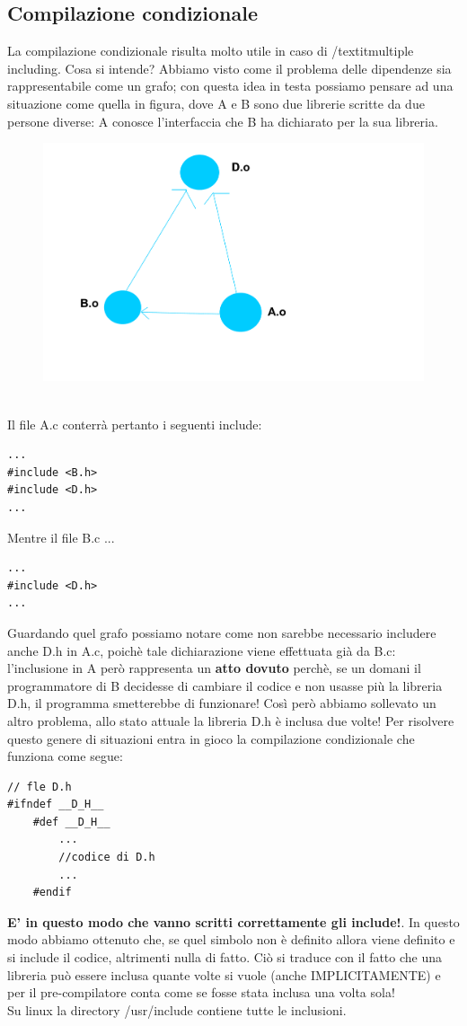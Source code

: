 \documentclass[a4paper,12pt]{article} %
\begin{document}
\subsection{Compilazione condizionale}
La compilazione condizionale risulta molto utile in caso di /textit{multiple including}. Cosa si intende? Abbiamo visto come il problema delle dipendenze sia rappresentabile come un grafo; con questa idea in testa possiamo pensare ad una situazione come quella in figura, dove A e B sono due librerie scritte da due persone diverse: A conosce l'interfaccia che B ha dichiarato per la sua libreria.\\
\begin{figure}[h]
\centering
\includegraphics[width=15.5cm]{dipendenze.pdf}
\end{figure}\\
Il file A.c conterrà pertanto i seguenti include:
\begin{lstlisting}
...
#include <B.h>
#include <D.h>
...
\end{lstlisting}
Mentre il file B.c ...
\begin{lstlisting}
...
#include <D.h>
...
\end{lstlisting}
Guardando quel grafo possiamo notare come non sarebbe necessario includere anche D.h in A.c, poichè tale dichiarazione viene effettuata già da B.c: l'inclusione in A però rappresenta un \textbf{atto dovuto} perchè, se un domani il programmatore di B decidesse di cambiare il codice e non usasse più la libreria D.h, il programma smetterebbe di funzionare! Così però abbiamo sollevato un altro problema, allo stato attuale la libreria D.h è inclusa due volte! Per risolvere questo genere di situazioni entra in gioco la compilazione condizionale che funziona come segue:
\begin{lstlisting}
// fle D.h 
#ifndef __D_H__
	#def __D_H__
		...
		//codice di D.h
		...
	#endif
\end{lstlisting}
\textbf{E' in questo modo che vanno scritti correttamente gli include!}. In questo modo abbiamo ottenuto che, se quel simbolo non è definito allora viene definito e si include il codice, altrimenti nulla di fatto. Ciò si traduce con il fatto che una libreria può essere inclusa quante volte si vuole (anche IMPLICITAMENTE) e per il pre-compilatore conta come se fosse stata inclusa una volta sola!\\
Su linux la directory /usr/include contiene tutte le inclusioni.
\end{document}
